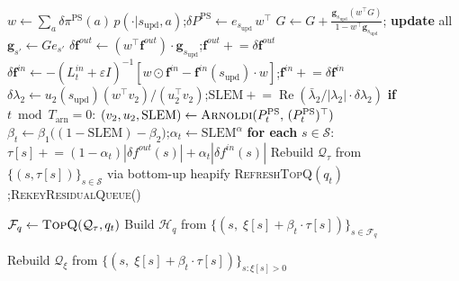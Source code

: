 \documentclass[10pt,a4paper]{article}
\begin{document}
\begin{algorithm}[!h]
\begin{algorithmic}[1]
\Statex
{} 
  \State $w \gets \sum_a \delta\pi^{\mathrm{PS}}(a)\,p(\cdot|s_{\mathrm{upd}},a)$;\quad $\delta P^{\mathrm{PS}} \gets e_{s_{\mathrm{upd}}}\,w^\top$ 
  \State $G \gets G + \frac{\mathbf{g}_{s_{\mathrm{upd}}}(w^\top G)}{1-w^\top\mathbf{g}_{s_{\mathrm{upd}}}}$; \textbf{update} all $\mathbf{g}_{s'} \gets Ge_{s'}$ 
  \State $\delta\mathbf{f}^{out} \gets (w^\top\mathbf{f}^{out})\cdot\mathbf{g}_{s_{\mathrm{upd}}}$;\quad $\mathbf{f}^{out} \mathrel{+}= \delta\mathbf{f}^{out}$ 
  \State $\delta\mathbf{f}^{in} \gets -(L^{in}_t+\varepsilon I)^{-1}[w\odot\mathbf{f}^{in} - \mathbf{f}^{in}(s_{\mathrm{upd}})\cdot w]$;\quad $\mathbf{f}^{in} \mathrel{+}= \delta\mathbf{f}^{in}$ 
  \State $\delta\lambda_2 \gets u_2(s_{\mathrm{upd}})(w^\top v_2)/(u_2^\top v_2)$;\quad $\mathrm{SLEM} \mathrel{+}= \operatorname{Re}(\bar\lambda_2/|\lambda_2|\cdot\delta\lambda_2)$ 
  \State \textbf{if} $t \bmod T_{\mathrm{arn}} = 0$: $(v_2,u_2,\mathrm{SLEM}) \gets \textsc{Arnoldi}(P^{\mathrm{PS}}_t,\,(P^{\mathrm{PS}}_t)^\top)$
  \State $\beta_t \gets \beta_1\bigl((1-\mathrm{SLEM}) - \beta_2\bigr)$;\quad $\alpha_t \gets \mathrm{SLEM}^{\alpha}$
  \State \textbf{for each} $s \in \mathcal{S}$: $\tau[s] \mathrel{+}= (1-\alpha_t)|\delta f^{out}(s)| + \alpha_t|\delta f^{in}(s)|$ 
  \State Rebuild $\mathcal{Q}_{\tau}$ from $\{(s,\tau[s])\}_{s\in\mathcal{S}}$ via bottom-up heapify 
  \State \textsc{RefreshTopQ}$(q_t)$;\quad \textsc{RekeyResidualQueue}()
\EndProcedure

\Statex
{} 
  \State $\mathcal{F}_q \gets \textsc{TopQ}(\mathcal{Q}_{\tau}, q_t)$
  \State Build $\mathcal{H}_q$ from $\bigl\{(s,\; \xi[s]+\beta_t\cdot\tau[s])\bigr\}_{s\in\mathcal{F}_q}$
\EndProcedure

\Statex
{} 
  \State Rebuild $\mathcal{Q}_{\xi}$ from $\bigl\{(s,\; \xi[s]+\beta_t\cdot\tau[s])\bigr\}_{s:\xi[s]>0}$
\EndProcedure


\end{algorithmic}
\end{algorithm}
\end{document}
